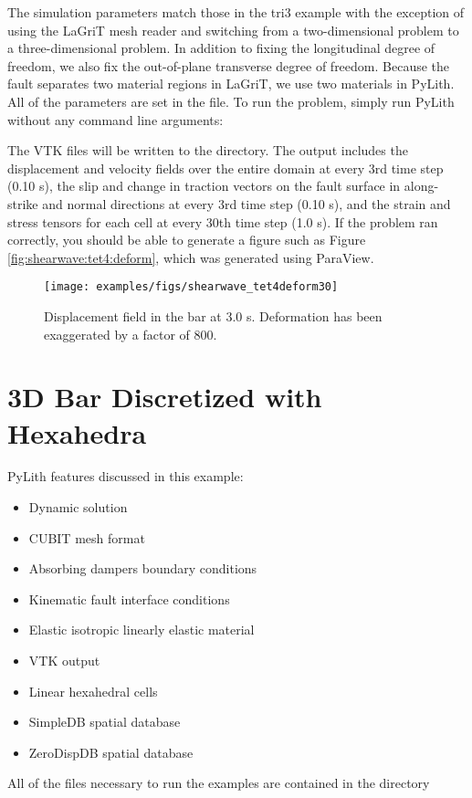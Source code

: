 The simulation parameters match those in the tri3 example with the
exception of using the LaGriT mesh reader and switching from a
two-dimensional problem to a three-dimensional problem. In addition to
fixing the longitudinal degree of freedom, we also fix the
out-of-plane transverse degree of freedom. Because the fault separates
two material regions in LaGriT, we use two materials in PyLith. All of
the parameters are set in the  file. To run
the problem, simply run PyLith without any command line arguments:
The VTK files will be written to the  directory. The
output includes the displacement and velocity fields over the entire
domain at every 3rd time step (0.10 s), the slip and change in
traction vectors on the fault surface in along-strike and normal
directions at every 3rd time step (0.10 s), and the strain and stress
tensors for each cell at every 30th time step (1.0 s). If the problem
ran correctly, you should be able to generate a figure such as Figure
\vref{fig:shearwave:tet4:deform}, which was generated using ParaView.

\begin{figure}
  \texttt{[image: examples/figs/shearwave\_tet4deform30]}
  \caption{Displacement field in the bar at 3.0 s. Deformation has been exaggerated
    by a factor of 800.}
  \label{fig:shearwave:tet4:deform}
\end{figure}


\section{3D Bar Discretized with Hexahedra}
\label{sec:example:shearwave:hex8}

PyLith features discussed in this example:
\begin{itemize}
\item Dynamic solution
\item CUBIT mesh format
\item Absorbing dampers boundary conditions
\item Kinematic fault interface conditions
\item Elastic isotropic linearly elastic material
\item VTK output
\item Linear hexahedral cells
\item SimpleDB spatial database
\item ZeroDispDB spatial database
\end{itemize}
All of the files necessary to run the examples are contained in the
directory 


